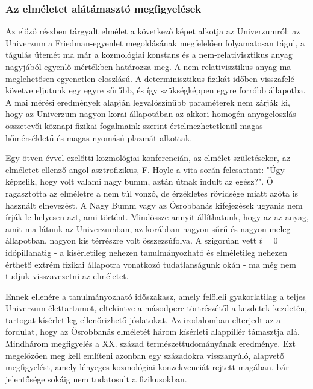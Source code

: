 \documentclass[../main.tex]{subfiles}
\begin{document}
\subsubsection{Az elméletet alátámasztó megfigyelések}
Az előző részben tárgyalt elmélet a következő képet alkotja az Univerzumról: az Univerzum a Friedman-egyenlet megoldásának megfelelően
folyamatosan tágul, a tágulás ütemét ma már a kozmológiai konstans és a nem-relativisztikus anyag nagyjából egyenlő mértékben határozza meg.
A nem-relativisztikus anyag ma meglehetősen egyenetlen eloszlású. A determinisztikus fizikát időben visszafelé követve eljutunk egy egyre sűrűbb, és
így szükségképpen egyre forróbb állapotba. A mai mérési eredmények alapján legvalószínűbb paraméterek nem zárják ki, hogy az Univerzum nagyon
korai állapotában az akkori homogén anyageloszlás összetevői köznapi fizikai fogalmaink szerint értelmezhetetlenül magas hőmérsékletű és magas nyomású plazmát alkottak.

Egy ötven évvel ezelőtti kozmológiai konferencián, az elmélet születésekor, az elméletet ellenző angol asztrofizikus, F. Hoyle a vita során felcsattant:
"Úgy képzelik, hogy volt valami nagy bumm, aztán útnak indult az egész?". Ő ragasztotta az elméletre a nem túl vonzó, de érzékletes rövidsége miatt
azóta is használt elnevezést. A Nagy Bumm vagy az Ősrobbanás kifejezések ugyanis nem írják le helyesen azt, ami történt. Mindössze annyit állíthatunk,
hogy az az anyag, amit ma látunk az Univerzumban, az korábban nagyon sűrű és nagyon meleg állapotban, nagyon kis térrészre volt összezsúfolva.
A szigorúan vett $t = 0$ időpillanatig - a kísérletileg nehezen tanulmányozható és elméletileg nehezen érthető extrém fizikai állapotra vonatkozó tudatlanságunk okán
- ma még nem tudjuk visszavezetni az elméletet.

Ennek ellenére a tanulmányozható időszakasz, amely felöleli gyakorlatilag a teljes Univerzum-élettartamot, eltekintve a másodperc törtrészétől a
kezdetek kezdetén, tartogat kísérletileg ellenőrizhető jóslatokat. Az irodalomban elterjedt az a fordulat, hogy az Ősrobbanás elméletét három kísérleti alappillér támasztja
alá. Mindhárom megfigyelés a XX. század természettudományának eredménye. Ezt megelőzően meg kell említeni azonban egy századokra visszanyúló, alapvető megfigyelést,
amely lényeges kozmológiai konzekvenciát rejtett magában, bár jelentősége sokáig nem tudatosult a fizikusokban.
\end{document}
